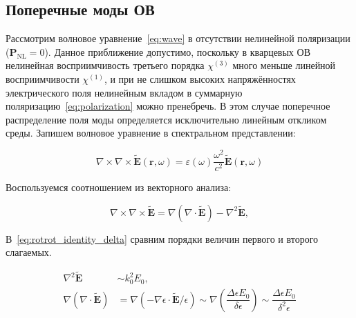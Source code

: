 \subsection{Поперечные моды ОВ}\label{subsec:modes}

Рассмотрим волновое уравнение~\eqref{eq:wave} в отсутствии нелинейной поляризации ($\mathbf{P_{\mathrm{NL}}}=0$). Данное приближение допустимо, поскольку в кварцевых ОВ нелинейная восприимчивость третьего порядка $\chi^{(3)}$ много меньше линейной восприимчивости $\chi^{(1)}$, и при не слишком высоких напряжённостях электрического поля нелинейным вкладом в суммарную поляризацию~\eqref{eq:polarization} можно пренебречь. В этом случае поперечное распределение поля моды определяется исключительно линейным откликом среды. Запишем волновое уравнение в спектральном представлении:




\begin{equation}\label{eq:helmholtz_vector}
	\nabla \times \nabla \times \widetilde{\mathbf{E}}(\mathbf{r},\omega) = \varepsilon(\omega) \frac{\omega^2}{c^2} \widetilde{\mathbf{E}}(\mathbf{r},\omega)
\end{equation}

Воспользуемся соотношением из векторного анализа:

\begin{equation}\label{eq:rotrot_identity_delta}
	\nabla \times \nabla \times \widetilde{\mathbf{E}} = \nabla(\nabla \cdot \widetilde{\mathbf{E}}) - \nabla^2 \widetilde{\mathbf{E}},
\end{equation}

В~\cref{eq:rotrot_identity_delta} сравним порядки величин первого и второго слагаемых.

\begin{subequations}\label{eq:e0_estimation}
	\begin{align}
		\nabla^2 \widetilde{\mathbf{E}} &\sim k_0^2E_0, \label{eq:e0_estimation_a} \\
		\nabla(\nabla \cdot \widetilde{\mathbf{E}}) &= \nabla(-\nabla\epsilon \cdot \widetilde{\mathbf{E}}/\epsilon) \sim \nabla\left(\dfrac{\Delta\epsilon E_0}{\delta \epsilon}\right) \sim \dfrac{\Delta \epsilon E_0}{\delta^2 \epsilon} \label{eq:e0_estimation_b}
	\end{align}
\end{subequations}

